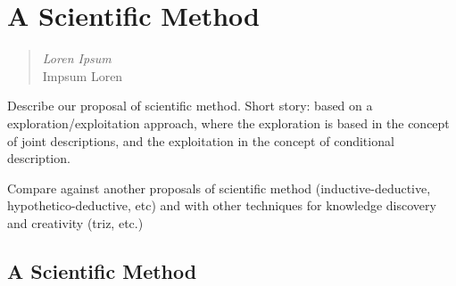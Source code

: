 %
%


\chapter{A Scientific Method}
\label{chap:scientific-method}

\begin{quote}
\begin{flushright}
\emph{Loren Ipsum}\\
Impsum Loren\\
\end{flushright}
\end{quote}
\bigskip

{\color{red} Describe our proposal of scientific method. Short story: based on a exploration/exploitation approach, where the exploration is based in the concept of joint descriptions, and the exploitation in the concept of conditional description.}

{\color{red} Compare against another proposals of scientific method (inductive-deductive, hypothetico-deductive, etc) and with other techniques for knowledge discovery and creativity (triz, etc.)}

\section{A Scientific Method}
